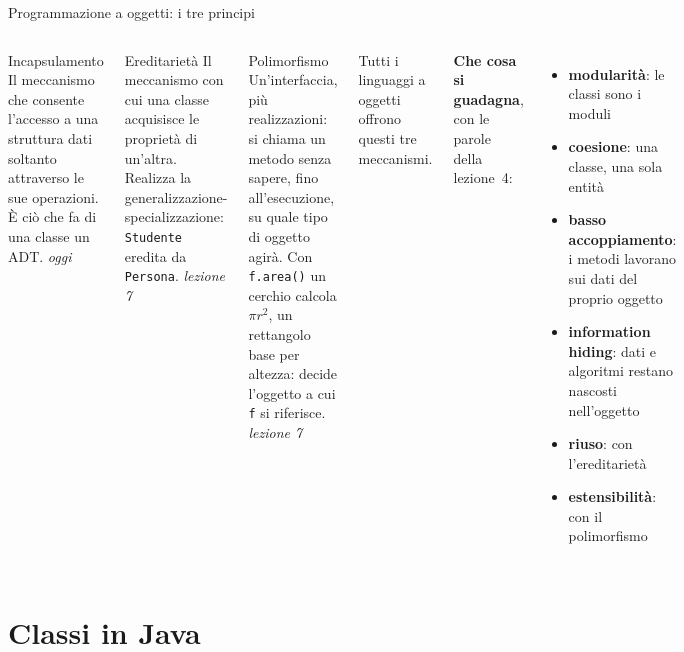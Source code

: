 \documentclass[10pt,aspectratio=169]{beamer}
\begin{document}
\begin{frame}{Programmazione a oggetti: i tre principi}
\begin{columns}[T]
\begin{block}{Incapsulamento}
\small Il meccanismo che consente l'accesso a una struttura dati soltanto attraverso le sue operazioni. È ciò che fa di una classe un ADT. \hfill\emph{oggi}
\end{block}
\begin{block}{Ereditarietà}
\small Il meccanismo con cui una classe acquisisce le proprietà di un'altra. Realizza la generalizzazione-specializzazione: \texttt{Studente} eredita da \texttt{Persona}. \hfill\emph{lezione 7}
\end{block}
\begin{block}{Polimorfismo}
\small Un'interfaccia, più realizzazioni: si chiama un metodo senza sapere, fino all'esecuzione, su quale tipo di oggetto agirà. Con \texttt{f.area()} un cerchio calcola $\pi r^2$, un rettangolo base per altezza: decide l'oggetto a cui \texttt{f} si riferisce. \hfill\emph{lezione 7}
\end{block}

\small
\vspace{0.2cm}
Tutti i linguaggi a oggetti offrono questi tre meccanismi.

\vspace{0.2cm}
\textbf{Che cosa si guadagna}, con le parole della lezione~4:
\begin{itemize}\itemsep=2pt
    \item \textbf{modularità}: le classi sono i moduli
    \item \textbf{coesione}: una classe, una sola entità
    \item \textbf{basso accoppiamento}: i metodi lavorano sui dati del proprio oggetto
    \item \textbf{information hiding}: dati e algoritmi restano nascosti nell'oggetto
    \item \textbf{riuso}: con l'ereditarietà
    \item \textbf{estensibilità}: con il polimorfismo
\end{itemize}
\end{columns}
\end{frame}

\section{Classi in Java}
\end{document}
